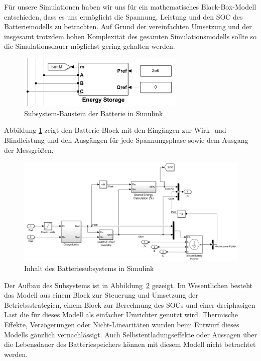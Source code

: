 Für unsere Simulationen haben wir uns für ein mathematisches Black-Box-Modell entschieden, dass es uns ermöglicht
die Spannung, Leistung und den SOC des Batteriemodells zu betrachten.
Auf Grund der vereinfachten Umsetzung und der insgesamt trotzdem hohen Komplexität des gesamten Simulationsmodells
sollte so die Simulationsdauer möglichst gering gehalten werden.

\begin{figure}[h!]
    \centering
    \includegraphics[width=8cm]{Abbildungen/BatterieBlackBox.png}
    \caption{Subsystem-Baustein der Batterie in Simulink}\label{BatModell}
\end{figure}
Abbildung \ref{BatModell} zeigt den Batterie-Block mit den Eingängen zur Wirk- und Blindleistung und den 
Ausgängen für jede Spannungsphase sowie dem Ausgang der Messgrößen.

\begin{figure}[h!]
    \centering
    \includegraphics[width=14cm]{Abbildungen/Speicher Ebene1.png}
    \caption{Inhalt des Batteriesubsystems in Simulink}\label{BatModell1}
\end{figure}

Der Aufbau des Subsystems ist in Abbildung~\ref{BatModell1} gezeigt.
Im Wesentlichen besteht das Modell aus einem Block zur Steuerung und Umsetzung der Betriebsstrategien, einem Block
zur Berechnung des SOCs und einer dreiphasigen Last die für dieses Modell als einfacher Umrichter genutzt wird.
Thermische Effekte, Verzögerungen oder Nicht-Linearitäten wurden beim Entwurf dieses Modells gänzlich vernachlässigt.
Auch Selbstentladungseffekte oder Aussagen über die Lebensdauer des Batteriespeichers können mit diesem Modell nicht 
betrachtet werden.

